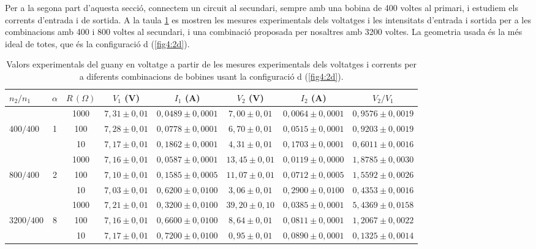 \documentclass[a4paper,10.5pt]{report}
\begin{document}
Per a la segona part d'aquesta secció, connectem un circuit al secundari, sempre amb una bobina de 400 voltes al primari, i estudiem els corrents d’entrada i de sortida. A la taula \ref{tab:4.4} es mostren les mesures experimentals dels voltatges i les intensitats d'entrada i sortida per a les combinacions amb 400 i 800 voltes al secundari, i una combinació proposada per nosaltres amb 3200 voltes. La geometria usada és la més ideal de totes, que és la configuració d (\ref{fig4:2d}). 

\begin{table}[H]
	\centering
	\renewcommand{\arraystretch}{1.2}
	\caption{Valors experimentals del guany en voltatge a partir de les mesures experimentals dels voltatges i corrents per a diferents combinacions de bobines usant la configuració d (\ref{fig4:2d}).}
	\begin{tabular}{lccccccc}
		\toprule
		$n_2/n_1$ & $\alpha$ & $R\,(\Omega)$ & $V_1$ (V) & $I_1$ (A) & $V_2$ (V) & $I_2$ (A) & $V_2/V_1$ \\
		\midrule
		& & 1000 & $7{,}31 \pm 0{,}01$ & $0{,}0489 \pm 0{,}0001$ & $7{,}00 \pm 0{,}01$ & $0{,}0064 \pm 0{,}0001$ & $0{,}9576 \pm 0{,}0019$ \\
		$400/400$ & 1 & 100  & $7{,}28 \pm 0{,}01$ & $0{,}0778 \pm 0{,}0001$ & $6{,}70 \pm 0{,}01$ & $0{,}0515 \pm 0{,}0001$ & $0{,}9203 \pm 0{,}0019$ \\
		& & 10   & $7{,}17 \pm 0{,}01$ & $0{,}1862 \pm 0{,}0001$ & $4{,}31 \pm 0{,}01$ & $0{,}1703 \pm 0{,}0001$ & $0{,}6011 \pm 0{,}0016$ \\
		\midrule
		& & 1000 & $7{,}16 \pm 0{,}01$ & $0{,}0587 \pm 0{,}0001$ & $13{,}45 \pm 0{,}01$ & $0{,}0119 \pm 0{,}0000$ & $1{,}8785 \pm 0{,}0030$ \\
		$800/400$ & 2 & 100  & $7{,}10 \pm 0{,}01$ & $0{,}1585 \pm 0{,}0005$ & $11{,}07 \pm 0{,}01$ & $0{,}0712 \pm 0{,}0005$ & $1{,}5592 \pm 0{,}0026$ \\
		& & 10   & $7{,}03 \pm 0{,}01$ & $0{,}6200 \pm 0{,}0100$ & $3{,}06 \pm 0{,}01$ & $0{,}2900 \pm 0{,}0100$ & $0{,}4353 \pm 0{,}0016$ \\
		\midrule
		& & 1000 & $7{,}21 \pm 0{,}01$ & $0{,}3200 \pm 0{,}0100$ & $39{,}20 \pm 0{,}10$ & $0{,}0385 \pm 0{,}0001$ & $5{,}4369 \pm 0{,}0158$ \\
		$3200/400$ & 8 & 100  & $7{,}16 \pm 0{,}01$ & $0{,}6600 \pm 0{,}0100$ & $8{,}64 \pm 0{,}01$ & $0{,}0811 \pm 0{,}0001$ & $1{,}2067 \pm 0{,}0022$ \\
		& & 10   & $7{,}17 \pm 0{,}01$ & $0{,}7200 \pm 0{,}0100$ & $0{,}95 \pm 0{,}01$ & $0{,}0890 \pm 0{,}0001$ & $0{,}1325 \pm 0{,}0014$ \\
		\bottomrule
	\end{tabular}
	\label{tab:4.4}
\end{table}
\end{document}
